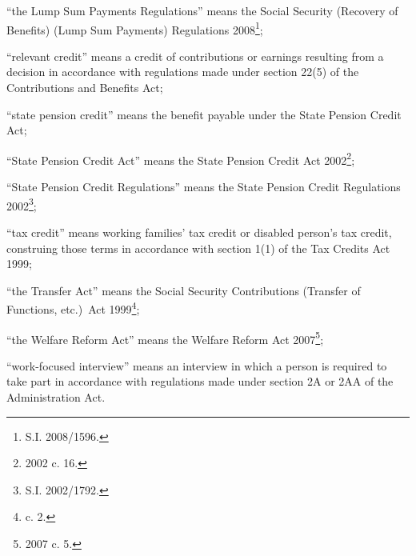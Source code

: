 \documentclass[12pt,a4paper]{article}
\begin{document}
\begin{enumerate}
“the Lump Sum Payments Regulations” means the Social Security (Recovery of Benefits) (Lump Sum Payments) Regulations 2008\footnote{S.I. 2008/1596.};

“relevant credit” means a credit of contributions or earnings resulting from a decision in accordance with regulations made under section 22(5) of the Contributions and Benefits Act;

“state pension credit” means the benefit payable under the State Pension Credit Act;

“State Pension Credit Act” means the State Pension Credit Act 2002\footnote{2002 c. 16.};

“State Pension Credit Regulations” means the State Pension Credit Regulations 2002\footnote{S.I. 2002/1792.};

“tax credit” means working families' tax credit or disabled person’s tax credit, construing those terms in accordance with section 1(1) of the Tax Credits Act 1999;

“the Transfer Act” means the Social Security Contributions (Transfer of Functions, etc.)\ Act 1999\footnote{ c. 2.};

“the Welfare Reform Act” means the Welfare Reform Act 2007\footnote{2007 c. 5.};



“work-focused interview” means an interview in which a person is required to take part in accordance with regulations made under section 2A or 2AA of the Administration Act.

\end{enumerate}
\end{document}
